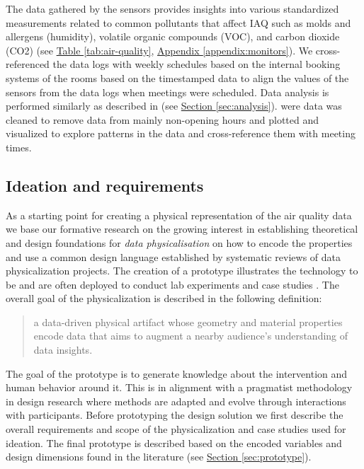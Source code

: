 The data gathered by the sensors provides insights into various standardized measurements related to common pollutants that affect IAQ such as molds and allergens (humidity), volatile organic compounds (VOC), and carbon dioxide (CO2) (see \hyperref[tab:air-quality]{Table \ref*{tab:air-quality}}, \hyperref[appendix:monitors]{Appendix \ref*{appendix:monitors}}). We cross-referenced the data logs with weekly schedules based on the internal booking systems of the rooms based on the timestamped data to align the values of the sensors from the data logs when meetings were scheduled. Data analysis is performed similarly as described in (see \hyperref[sec:analysis]{Section \ref*{sec:analysis}}). were data was cleaned to remove data from mainly non-opening hours and plotted and visualized to explore patterns in the data and cross-reference them with meeting times.

\subsection{Ideation and requirements}
\label{sec:ideation}

As a starting point for creating a physical representation of the air quality data we base our formative research on the growing interest in establishing theoretical and design foundations for \textit{data physicalisation} \cite{hornecker_design_2023, sauve_physecology_2022, bae_making_2022} on how to encode the properties and use a common design language \cite{ranasinghe_encoding_2023, sosa_data_2018} established by systematic reviews of data physicalization projects. The creation of a prototype illustrates the technology to be and are often deployed to conduct lab experiments and case studies \cite{jonathan_lazar_research_2017}. The overall goal of the physicalization is described in the following definition:

\begin{quote}
a data-driven physical artifact whose geometry and material properties encode data that aims to augment a nearby audience’s understanding of data insights.
\end{quote}

The goal of the prototype is to generate knowledge about the intervention and human behavior around it. This is in alignment with a pragmatist methodology in design research where methods are adapted and evolve through interactions with participants. Before prototyping the design solution we first describe the overall requirements and scope of the physicalization and case studies used for ideation. The final prototype is described based on the encoded variables and design dimensions found in the literature (see \hyperref[sec:prototype]{Section \ref*{sec:prototype}}).

